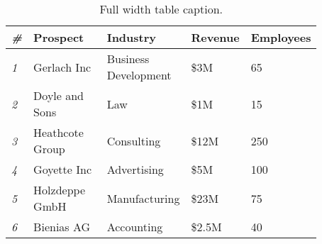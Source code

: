 
\begin{table*} %
    \caption{Full width table caption.}
    \begin{tabular}{C{0.03\linewidth} L{0.25\linewidth} L{0.27\linewidth} L{0.16\linewidth} L{0.16\linewidth}}
        \toprule
        \textit{\#} & \textbf{Prospect} & \textbf{Industry} & \textbf{Revenue} & \textbf{Employees} \\
        \midrule
        \textit{1} & Gerlach Inc & Business Development & \$3M & 65\\
        \textit{2} & Doyle and Sons & Law & \$1M & 15\\
        \textit{3} & Heathcote Group & Consulting & \$12M & 250\\
        \textit{4} & Goyette Inc & Advertising & \$5M & 100\\
        \textit{5} & Holzdeppe GmbH & Manufacturing & \$23M & 75\\
        \textit{6} & Bienias AG & Accounting & \$2.5M & 40\\
        \bottomrule
    \end{tabular}
\end{table*}
